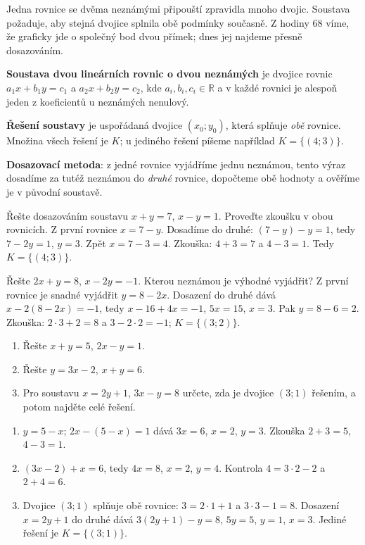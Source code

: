 \documentclass[11pt,a4paper]{article}
\begin{document}
Jedna rovnice se dvěma neznámými připouští zpravidla mnoho dvojic. Soustava požaduje, aby stejná dvojice splnila obě podmínky současně. Z hodiny 68 víme, že graficky jde o společný bod dvou přímek; dnes jej najdeme přesně dosazováním.
\begin{definiceBox}
\textbf{Soustava dvou lineárních rovnic o dvou neznámých} je dvojice rovnic $a_1x+b_1y=c_1$ a $a_2x+b_2y=c_2$, kde $a_i,b_i,c_i\in\mathbb R$ a v každé rovnici je alespoň jeden z koeficientů u neznámých nenulový.
\end{definiceBox}
\begin{definiceBox}
\textbf{Řešení soustavy} je uspořádaná dvojice $(x_0;y_0)$, která splňuje \emph{obě} rovnice. Množina všech řešení je $K$; u jediného řešení píšeme například $K=\{(4;3)\}$.
\end{definiceBox}
\begin{definiceBox}
\textbf{Dosazovací metoda}: z jedné rovnice vyjádříme jednu neznámou, tento výraz dosadíme za tutéž neznámou do \emph{druhé} rovnice, dopočteme obě hodnoty a ověříme je v původní soustavě.
\end{definiceBox}
\begin{prikladReseniBox}
Řešte dosazováním soustavu $x+y=7$, $x-y=1$. Proveďte zkoušku v obou rovnicích.
\tcblower
Z první rovnice $x=7-y$. Dosadíme do druhé: $(7-y)-y=1$, tedy $7-2y=1$, $y=3$. Zpět $x=7-3=4$. Zkouška: $4+3=7$ a $4-3=1$. Tedy $K=\{(4;3)\}$.
\end{prikladReseniBox}
\begin{prikladReseniBox}
Řešte $2x+y=8$, $x-2y=-1$. Kterou neznámou je výhodné vyjádřit?
\tcblower
Z první rovnice je snadné vyjádřit $y=8-2x$. Dosazení do druhé dává $x-2(8-2x)=-1$, tedy $x-16+4x=-1$, $5x=15$, $x=3$. Pak $y=8-6=2$. Zkouška: $2\cdot3+2=8$ a $3-2\cdot2=-1$; $K=\{(3;2)\}$.
\end{prikladReseniBox}
\begin{zadaniReseniBox}
\begin{enumerate}[label=\alph*)]
\item Řešte $x+y=5$, $2x-y=1$.
\item Řešte $y=3x-2$, $x+y=6$.
\item Pro soustavu $x=2y+1$, $3x-y=8$ určete, zda je dvojice $(3;1)$ řešením, a potom najděte celé řešení.
\end{enumerate}
\tcblower
\begin{enumerate}[label=\alph*)]
\item $y=5-x$; $2x-(5-x)=1$ dává $3x=6$, $x=2$, $y=3$. Zkouška $2+3=5$, $4-3=1$.
\item $(3x-2)+x=6$, tedy $4x=8$, $x=2$, $y=4$. Kontrola $4=3\cdot2-2$ a $2+4=6$.
\item Dvojice $(3;1)$ splňuje obě rovnice: $3=2\cdot1+1$ a $3\cdot3-1=8$. Dosazení $x=2y+1$ do druhé dává $3(2y+1)-y=8$, $5y=5$, $y=1$, $x=3$. Jediné řešení je $K=\{(3;1)\}$.
\end{enumerate}
\end{zadaniReseniBox}
\end{document}
